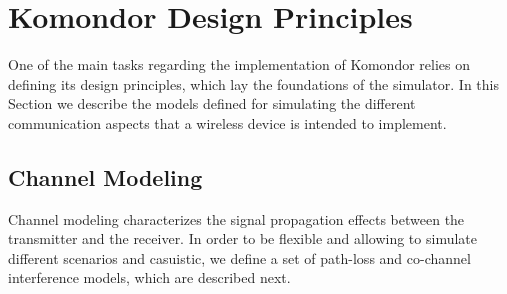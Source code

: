 \documentclass[a4paper]{article}
\begin{document}
\section{Komondor Design Principles}
\label{section:system_model}
One of the main tasks regarding the implementation of Komondor relies on defining its design principles, which lay the foundations of the simulator. In this Section we describe the models defined for simulating the different communication aspects that a wireless device is intended to implement.
	
	\subsection{Channel Modeling}
	Channel modeling characterizes the signal propagation effects between the transmitter and the receiver. In order to be flexible and allowing to simulate different scenarios and casuistic, we define a set of path-loss and co-channel interference models, which are described next.
	
\end{document}
